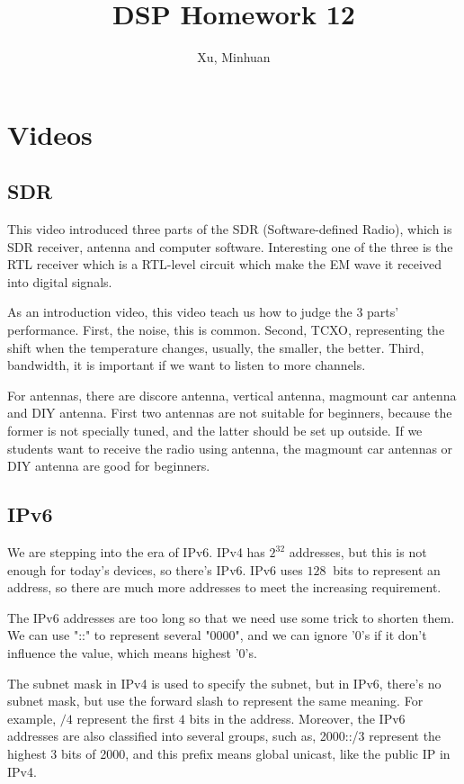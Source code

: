 \documentclass{article}
\begin{document}
\title{DSP Homework 12}
\author{Xu, Minhuan}
\maketitle
\tableofcontents
\begin{abstract}

\end{abstract}



\section{Videos}
\subsection{SDR}
This video introduced three parts of the SDR (Software-defined Radio), which is SDR receiver, antenna and computer software. Interesting one of the three is the RTL receiver which is a RTL-level circuit which make the EM wave it received into digital signals. 

As an introduction video, this video teach us how to judge the 3 parts' performance. First, the noise, this is common. Second, TCXO, representing the shift when the temperature changes, usually, the smaller, the better. Third, bandwidth, it is important if we want to listen to more channels.

For antennas, there are discore antenna, vertical antenna, magmount car antenna and DIY antenna. First two antennas are not suitable for beginners, because the former is not specially tuned, and the latter should be set up outside. If we students want to receive the radio using antenna, the magmount car antennas or DIY antenna are good for beginners.

\subsection{IPv6}
We are stepping into the era of IPv6. IPv4 has $2^32$ addresses, but this is not enough for today's devices, so there's IPv6. IPv6 uses $128 ~$ bits to represent an address, so there are much more addresses to meet the increasing requirement.

The IPv6 addresses are too long so that we need use some trick to shorten them. We can use "::" to represent several "0000", and we can ignore '0's if it don't influence the value, which means highest '0's.

The subnet mask in IPv4 is used to specify the subnet, but in IPv6, there's no subnet mask, but use the forward slash to represent the same meaning. For example, $/4$ represent the first $4$ bits in the address. Moreover, the IPv6 addresses are also classified into several groups, such as, 2000::/3 represent the highest 3 bits of 2000, and this prefix means global unicast, like the public IP in IPv4.
\end{document}
